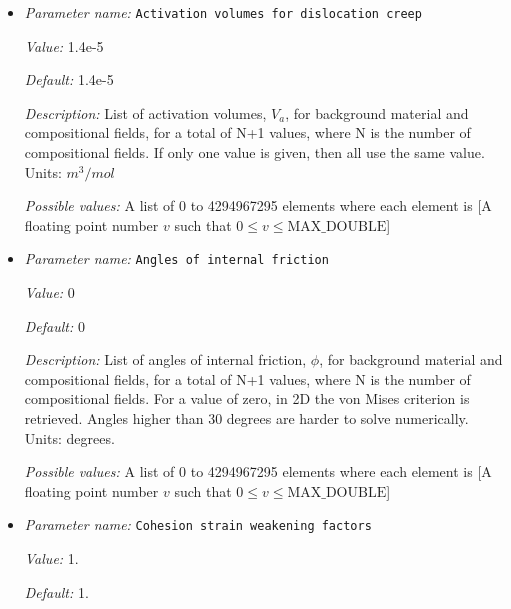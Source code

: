\begin{itemize}
{\it Possible values:} A list of 0 to 4294967295 elements where each element is [A floating point number $v$ such that $0 \leq v \leq \text{MAX\_DOUBLE}$]
\item {\it Parameter name:} {\tt Activation volumes for dislocation creep}
\label{parameters:Material model/Visco Plastic/Activation volumes for dislocation creep}


{\it Value:} 1.4e-5


{\it Default:} 1.4e-5


{\it Description:} List of activation volumes, $V_a$, for background material and compositional fields, for a total of N+1 values, where N is the number of compositional fields. If only one value is given, then all use the same value.  Units: $m^3 / mol$


{\it Possible values:} A list of 0 to 4294967295 elements where each element is [A floating point number $v$ such that $0 \leq v \leq \text{MAX\_DOUBLE}$]
\item {\it Parameter name:} {\tt Angles of internal friction}
\label{parameters:Material model/Visco Plastic/Angles of internal friction}


{\it Value:} 0


{\it Default:} 0


{\it Description:} List of angles of internal friction, $\phi$, for background material and compositional fields, for a total of N+1 values, where N is the number of compositional fields. For a value of zero, in 2D the von Mises criterion is retrieved. Angles higher than 30 degrees are harder to solve numerically. Units: degrees.


{\it Possible values:} A list of 0 to 4294967295 elements where each element is [A floating point number $v$ such that $0 \leq v \leq \text{MAX\_DOUBLE}$]
\item {\it Parameter name:} {\tt Cohesion strain weakening factors}
\label{parameters:Material model/Visco Plastic/Cohesion strain weakening factors}


{\it Value:} 1.


{\it Default:} 1.



\end{itemize}
